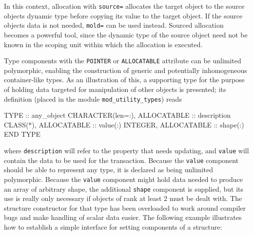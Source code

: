 \documentclass[]{scrartcl}
\newenvironment{Shaded}{}{}
\newcommand{\DataTypeTok}[1]{\textcolor[rgb]{0.56,0.13,0.00}{#1}}
\newcommand{\FunctionTok}[1]{\textcolor[rgb]{0.02,0.16,0.49}{#1}}
\newcommand{\NormalTok}[1]{#1}
\begin{document}
In this context, allocation with \texttt{source=} allocates the target
object to the source object\textquotesingle s dynamic type before
copying its value to the target object. If the source
object\textquotesingle s data is not needed, \texttt{mold=} can be used
instead. Sourced allocation becomes a powerful tool, since the dynamic
type of the source object need not be known in the scoping unit within
which the allocation is executed.

Type components with the \texttt{POINTER} or \texttt{ALLOCATABLE}
attribute can be unlimited polymorphic, enabling the construction of
generic and potentially inhomogeneous container-like types. As an
illustration of this, a supporting type for the purpose of holding data
targeted for manipulation of other objects is presented; its definition
(placed in the module \texttt{mod\_utility\_types}) reads

\begin{Shaded}
\begin{Highlighting}[]
\DataTypeTok{TYPE} \DataTypeTok{::}\NormalTok{ any\_object}
   \DataTypeTok{CHARACTER(len=:)}\NormalTok{, }\DataTypeTok{ALLOCATABLE} \DataTypeTok{::}\NormalTok{ description}
   \DataTypeTok{CLASS(*)}\NormalTok{, }\DataTypeTok{ALLOCATABLE} \DataTypeTok{::} \DataTypeTok{value}\NormalTok{(:)}
   \DataTypeTok{INTEGER}\NormalTok{, }\DataTypeTok{ALLOCATABLE} \DataTypeTok{::} \FunctionTok{shape}\NormalTok{(:)}
\DataTypeTok{END TYPE}
\end{Highlighting}
\end{Shaded}

where \texttt{description} will refer to the property that needs
updating, and \texttt{value} will contain the data to be used for the
transaction. Because the \texttt{value} component should be able to
represent any type, it is declared as being unlimited polymorphic.
Because the \texttt{value} component might hold data needed to produce
an array of arbitrary shape, the additional \texttt{shape} component is
supplied, but its use is really only necessary if objects of rank at
least 2 must be dealt with. The structure constructor for that type has
been overloaded to work around compiler bugs and make handling of scalar
data easier. The following example illustrates how to establish a simple
interface for setting components of a structure:
\end{document}
